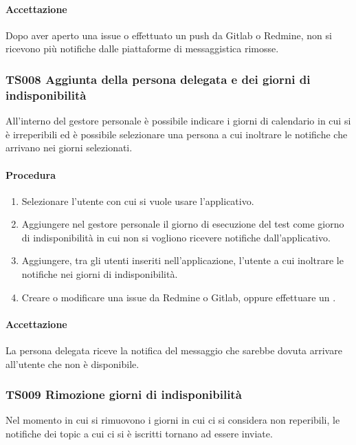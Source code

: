 		\paragraph*{Accettazione}
		Dopo aver aperto una issue o effettuato un push da Gitlab o Redmine, non si ricevono più notifiche dalle piattaforme di messaggistica rimosse.
		
	\subsubsection{TS008 Aggiunta della persona delegata e dei giorni di indisponibilità}
		All'interno del gestore personale è possibile indicare i giorni di calendario in cui si è irreperibili ed è possibile selezionare una persona a cui inoltrare le notifiche che arrivano nei giorni selezionati.
		
		\paragraph*{Procedura}
			\begin{enumerate}
				\item Selezionare l'utente con cui si vuole usare l'applicativo.
				\item Aggiungere nel gestore personale il giorno di esecuzione del test come giorno di indisponibilità in cui non si vogliono ricevere notifiche dall'applicativo.
				\item Aggiungere, tra gli utenti inseriti nell'applicazione, l'utente a cui inoltrare le notifiche nei giorni di indisponibilità.
				\item Creare o modificare una issue da Redmine o Gitlab, oppure effettuare un . 
			\end{enumerate}
		
		\paragraph*{Accettazione}
		La persona delegata riceve la notifica del messaggio che sarebbe dovuta arrivare all'utente che non è disponibile.
		
	\subsubsection{TS009 Rimozione giorni di indisponibilità}
		Nel momento in cui si rimuovono i giorni in cui ci si considera non reperibili, le notifiche dei topic a cui ci si è iscritti tornano ad essere inviate.
		
